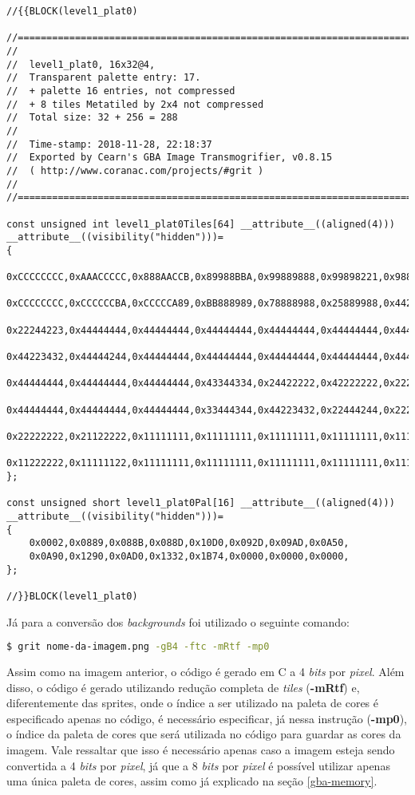 \begin{lstlisting}[caption={\textit{Código fonte} da parte superior da imagem da plataforma da primeira fase.},label={lst:imagecpp}]
//{{BLOCK(level1_plat0)

//======================================================================
//
//  level1_plat0, 16x32@4,
//  Transparent palette entry: 17.
//  + palette 16 entries, not compressed
//  + 8 tiles Metatiled by 2x4 not compressed
//  Total size: 32 + 256 = 288
//
//  Time-stamp: 2018-11-28, 22:18:37
//  Exported by Cearn's GBA Image Transmogrifier, v0.8.15
//  ( http://www.coranac.com/projects/#grit )
//
//======================================================================

const unsigned int level1_plat0Tiles[64] __attribute__((aligned(4))) __attribute__((visibility("hidden")))=
{
    0xCCCCCCCC,0xAAACCCCC,0x888AACCB,0x89988BBA,0x99889888,0x99898221,0x98822222,0x81122444,
    0xCCCCCCCC,0xCCCCCCBA,0xCCCCCA89,0xBB888989,0x78888988,0x25889988,0x44225889,0x22444168,
    0x22244223,0x44444444,0x44444444,0x44444444,0x44444444,0x44444444,0x44444444,0x44444444,
    0x44223432,0x44444244,0x44444444,0x44444444,0x44444444,0x44444444,0x44444444,0x44444444,
    0x44444444,0x44444444,0x44444444,0x43344334,0x24422222,0x42222222,0x22222222,0x22222222,
    0x44444444,0x44444444,0x44444444,0x33444344,0x44223432,0x22444244,0x22222222,0x11222222,
    0x22222222,0x21122222,0x11111111,0x11111111,0x11111111,0x11111111,0x11111111,0x11111111,
    0x11222222,0x11111122,0x11111111,0x11111111,0x11111111,0x11111111,0x11111111,0x11111111,
};

const unsigned short level1_plat0Pal[16] __attribute__((aligned(4))) __attribute__((visibility("hidden")))=
{
    0x0002,0x0889,0x088B,0x088D,0x10D0,0x092D,0x09AD,0x0A50,
    0x0A90,0x1290,0x0AD0,0x1332,0x1B74,0x0000,0x0000,0x0000,
};

//}}BLOCK(level1_plat0)
\end{lstlisting}

Já para a conversão dos \textit{backgrounds} foi utilizado o seguinte comando:

\begin{lstlisting}[language=bash,caption={Comando para conversão dos \textit{backgrounds} em código}]
$ grit nome-da-imagem.png -gB4 -ftc -mRtf -mp0
\end{lstlisting}

Assim como na imagem anterior, o código é gerado em C a 4 \textit{bits} por \textit{pixel}. Além disso, o código é gerado utilizando redução completa de \textit{tiles} (\textbf{-mRtf}) e, diferentemente das sprites, onde o índice a ser utilizado na paleta de cores é especificado apenas no código, é necessário especificar, já nessa instrução (\textbf{-mp0}), o índice da paleta de cores que será utilizada no código para guardar as cores da imagem. Vale ressaltar que isso é necessário apenas caso a imagem esteja sendo convertida a 4 \textit{bits} por \textit{pixel}, já que a 8 \textit{bits} por \textit{pixel} é possível utilizar apenas uma única paleta de cores, assim como já explicado na seção \ref{gba-memory}.



